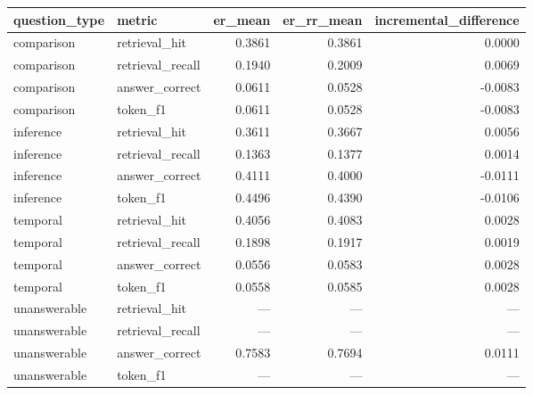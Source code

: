 \begin{tabular}{llrrr}
\toprule
question_type & metric & er_mean & er_rr_mean & incremental_difference \\
\midrule
comparison & retrieval_hit & 0.3861 & 0.3861 & 0.0000 \\
comparison & retrieval_recall & 0.1940 & 0.2009 & 0.0069 \\
comparison & answer_correct & 0.0611 & 0.0528 & -0.0083 \\
comparison & token_f1 & 0.0611 & 0.0528 & -0.0083 \\
inference & retrieval_hit & 0.3611 & 0.3667 & 0.0056 \\
inference & retrieval_recall & 0.1363 & 0.1377 & 0.0014 \\
inference & answer_correct & 0.4111 & 0.4000 & -0.0111 \\
inference & token_f1 & 0.4496 & 0.4390 & -0.0106 \\
temporal & retrieval_hit & 0.4056 & 0.4083 & 0.0028 \\
temporal & retrieval_recall & 0.1898 & 0.1917 & 0.0019 \\
temporal & answer_correct & 0.0556 & 0.0583 & 0.0028 \\
temporal & token_f1 & 0.0558 & 0.0585 & 0.0028 \\
unanswerable & retrieval_hit & — & — & — \\
unanswerable & retrieval_recall & — & — & — \\
unanswerable & answer_correct & 0.7583 & 0.7694 & 0.0111 \\
unanswerable & token_f1 & — & — & — \\
\bottomrule
\end{tabular}
